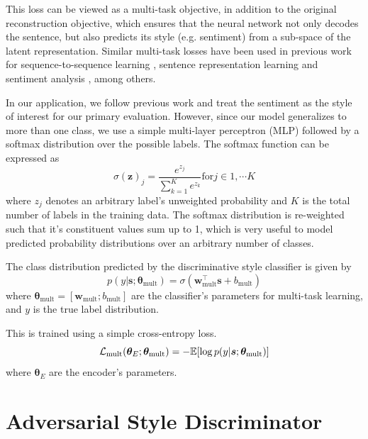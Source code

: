 This loss can be viewed as a multi-task objective, in addition to the original reconstruction objective, which ensures that the neural network not only decodes the sentence, but also predicts its style (e.g. sentiment) from a sub-space of the latent representation. Similar multi-task losses have been used in previous work for sequence-to-sequence learning \citep{luong2015multi}, sentence representation learning \citep{jernite2017discourse} and sentiment analysis \citep{balikas2017multitask}, among others.

In our application, we follow previous work \citep{hu2017toward,shen2017style,fu2017style} and treat the sentiment as the style of interest for our primary evaluation. However, since our model generalizes to more than one class, we use a simple multi-layer perceptron (MLP) followed by a softmax distribution over the possible labels. The softmax function can be expressed as
\begin{equation*}
	\sigma(\mathbf{z})_j = \frac{e^{z_j}}{\sum_{k=1}^K e^{z_k}} \text{for} j \in {1, \cdots K}
\end{equation*}
where $z_j$ denotes an arbitrary label's unweighted probability and $K$ is the total number of labels in the training data. The softmax distribution is re-weighted such that it's constituent values sum up to 1, which is very useful to model predicted probability distributions over an arbitrary number of classes.

The class distribution predicted by the discriminative style classifier is given by
\begin{equation} \label{eqn:class-pred}
	p(y | \bm s; \bm\theta_\text{mult}) = \sigma(\bm w_\text{mult}^\top \bm s + b_\text{mult})
\end{equation}
where $\bm\theta_\text{mult}=[\bm w_\text{mult}; b_\text{mult}]$ are the classifier's parameters for multi-task learning, and $y$ is the true label distribution.

This is trained using a simple cross-entropy loss.
\begin{equation} \label{eqn:multi-task-loss}
	\mathcal{L}_\text{mult}(\bm\theta_{E};\bm\theta_\text{mult}) =
	- \mathbb{E} [\log p(y | \bm s; \bm\theta_\text{mult})]
\end{equation}
where $\bm\theta_E$ are the encoder's parameters.


\section{Adversarial Style Discriminator} \label{sec:adversarial-style-objective}

